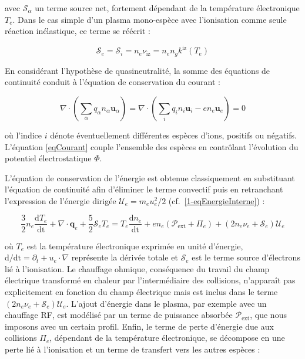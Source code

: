 \begin{refsection}
avec $\mathcal{S}_\alpha$ un terme source net, fortement dépendant de la
température électronique $T_e$. Dans le cas simple d'un plasma mono-espèce avec
l'ionisation comme seule réaction inélastique, ce terme se réécrit :

\begin{equation}
\mathcal S_e=\mathcal
S_i=n_e\nu_\text{iz}=n_en_gk^\text{iz}(T_e) 
\end{equation}

En considérant l'hypothèse de quasineutralité, la
somme des équations de continuité conduit à l'équation de conservation du courant :

\begin{equation}
\label{eqCourant}
\nabla\cdot(\sum_\alpha q_\alpha n_\alpha\mathbf
u_\alpha)=\nabla\cdot(\sum_iq_in_i\mathbf{u}_i-en_e\mathbf{u}_e)=0
\end{equation}

où l'indice $i$ dénote éventuellement différentes espèces d'ions, positifs ou
négatifs.
L'équation \eqref{eqCourant} couple l'ensemble des espèces en contrôlant
l'évolution du potentiel électrostatique $\Phi$.

L'équation de conservation de l'énergie est obtenue classiquement en substituant
l'équation de continuité afin d'éliminer le terme convectif puis en retranchant
l'expression de l'énergie dirigée $\mathcal{U}_e=m_eu_e^2/2$
(cf.~\eqref{1-eqEnergieInterne}) :

\begin{equation}
\label{3-eqTemperature}
\frac{3}{2}n_e\frac{\text{d}T_e}{\text{dt}}+\nabla\cdot\mathbf
q_e + \frac{5}{2}\mathcal{S}_e T_e = T_e\frac{\text{d}n_e}{\text{dt}}+ 
en_e\left(\mathcal{P}_\text{ext}+\Pi_e\right)+(2n_e\nu_e+\mathcal{S}_e)\mathcal{U}_e
\end{equation}

où $T_e$ est la température électronique exprimée en unité d'énergie,
$\text{d/dt}=\partial_t+u_e\cdot\nabla$ représente la dérivée totale et
$\mathcal{S}_e$ est le terme source d'électrons lié à l'ionisation. 
Le chauffage ohmique, conséquence du travail du champ électrique transformé en
chaleur par l'intermédiaire des collisions, n'apparaît pas explicitement en
fonction du champ électrique mais est inclus dans le terme
$(2n_e\nu_e+\mathcal{S}_e)\mathcal{U}_e$. L'ajout d'énergie dans le plasma, par
exemple avec un chauffage RF, est modélisé par un terme
de puissance absorbée $\mathcal{P}_\text{ext}$, que nous imposons avec un
certain profil. Enfin, le terme de perte d'énergie due aux collisions $\Pi_e$,
dépendant de la température électronique, se décompose en une perte lié à
l'ionisation et un terme de transfert vers les autres espèces :


\end{refsection}
